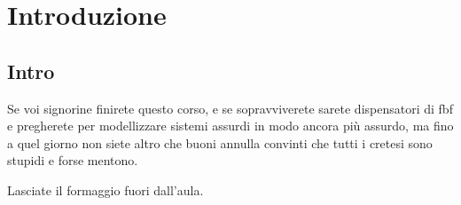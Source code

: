
\chapter{Introduzione}

\label{cap:introduction}


\section{Intro}

Se voi signorine finirete questo corso, e se sopravviverete sarete
dispensatori di fbf e pregherete per modellizzare sistemi assurdi
in modo ancora più assurdo, ma fino a quel giorno non siete altro
che buoni annulla convinti che tutti i cretesi sono stupidi e forse
mentono.

Lasciate il formaggio fuori dall'aula.
